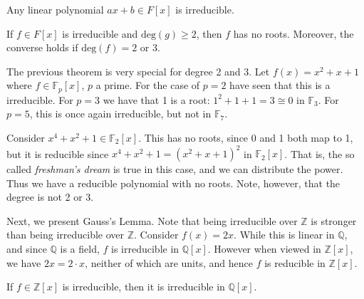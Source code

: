 \documentclass{article}                                                        %
\begin{document}
            \begin{theorem}
                Any linear polynomial $ax+b\in{F}[x]$ is irreducible.
            \end{theorem}
            \begin{theorem}
                If $f\in{F}[x]$ is irreducible and $\textrm{deg}(g)\geq{2}$,
                then $f$ has no roots. Moreover, the converse holds if
                $\textrm{deg}(f)=2$ or 3.
            \end{theorem}
            \begin{example}
                The previous theorem is very special for degree 2 and 3. Let
                $f(x)=x^{2}+x+1$ where $f\in\mathbb{F}_{p}[x]$, $p$ a prime.
                For the case of $p=2$ have seen that this is a irreducible. For
                $p=3$ we have that 1 is a root: $1^{2}+1+1=3\cong{0}$ in
                $\mathbb{F}_{3}$. For $p=5$, this is once again irreducible,
                but not in $\mathbb{F}_{7}$.
            \end{example}
            \begin{example}
                Consider $x^{4}+x^{2}+1\in\mathbb{F}_{2}[x]$. This has no roots,
                since 0 and 1 both map to 1, but it is reducible since
                $x^{4}+x^{2}+1=(x^{2}+x+1)^{2}$ in $\mathbb{F}_{2}[x]$. That is,
                the so called \textit{freshman's dream} is true in this case, and
                we can distribute the power. Thus we have a reducible polynomial
                with no roots. Note, however, that the degree is not 2 or 3.
            \end{example}
            Next, we present Gauss's Lemma. Note that being irreducible over
            $\mathbb{Z}$ is stronger than being irreducible over $\mathbb{Z}$.
            Consider $f(x)=2x$. While this is linear in $\mathbb{Q}$, and since
            $\mathbb{Q}$ is a field, $f$ is irreducible in $\mathbb{Q}[x]$. However
            when viewed in $\mathbb{Z}[x]$, we have $2x=2\cdot{x}$, neither of
            which are units, and hence $f$ is reducible in $\mathbb{Z}[x]$.
            \begin{theorem}
                If $f\in\mathbb{Z}[x]$ is irreducible, then it is irreducible in
                $\mathbb{Q}[x]$.
            \end{theorem}
\end{document}

